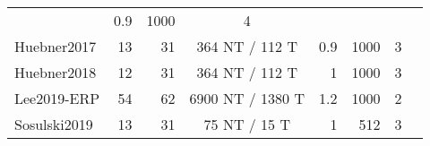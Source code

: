 \begin{tabularx}{\linewidth}{lrrcrrrr}
                   &0.9&1000& 4                          &                                          \\
		Huebner2017    & 13                         & 31          & 364 NT / 112 T
                   &0.9&1000& 3                          &                                          \\
		Huebner2018    & 12                         & 31          & 364 NT / 112 T
                   &1&1000& 3                          &                                          \\
		Lee2019-ERP   & 54                         & 62          & 6900 NT / 1380
    T         &1.2&1000& 2                          &                                          \\
		Sosulski2019   & 13                         & 31          & 75 NT / 15 T
                   &1&512& 3                          &                                          \\ \bottomrule
	\end{tabularx}
